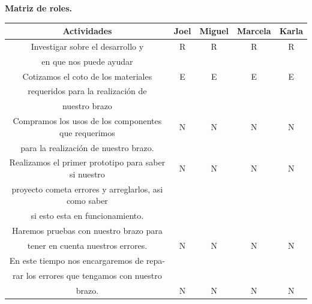 \documentclass[letterpaper]{article}
\begin{document}
\begin{large}
    \begin{LARGE}
        \textbf{Matriz de roles.}\\
        
    \end{LARGE}
    

\begin{tabular}{|c|c|c|c|c|}
\hline
    Actividades & Joel & Miguel & Marcela & Karla     \\ \hline
    Investigar sobre el desarrollo y      & R & R & R & R\\   
    en que nos puede ayudar             &   &   &   &  
     \\ \hline
    Cotizamos el coto de los materiales & E & E & E & E \\
    requeridos para la realización de   &   &   &   &   \\
    nuestro brazo                       &   &   &   &   \\ \hline
    Compramos los usos de los componentes que requerimos & N & N & N & N \\
    para la realización de nuestro brazo.                &   &   &   &   \\ \hline
    Realizamos el primer prototipo para saber si nuestro & N & N & N & N \\
    proyecto cometa errores y arreglarlos, asi como saber &  &   &   &   \\
     si esto esta en funcionamiento.                     &   &   &   &   \\ \hline
    Haremos pruebas con nuestro brazo para\\ tener en cuenta nuestros errores.   &  N   &  N  &  N  &  N \\ \hline
    En este tiempo nos encargaremos de repa-\\ rar los errores que tengamos con nuestro\\ brazo. &  N  &   N  &   N   &  N \\\hline
 
\end{tabular}
\end{large}\\ \newpage

 
   
\end{document}
